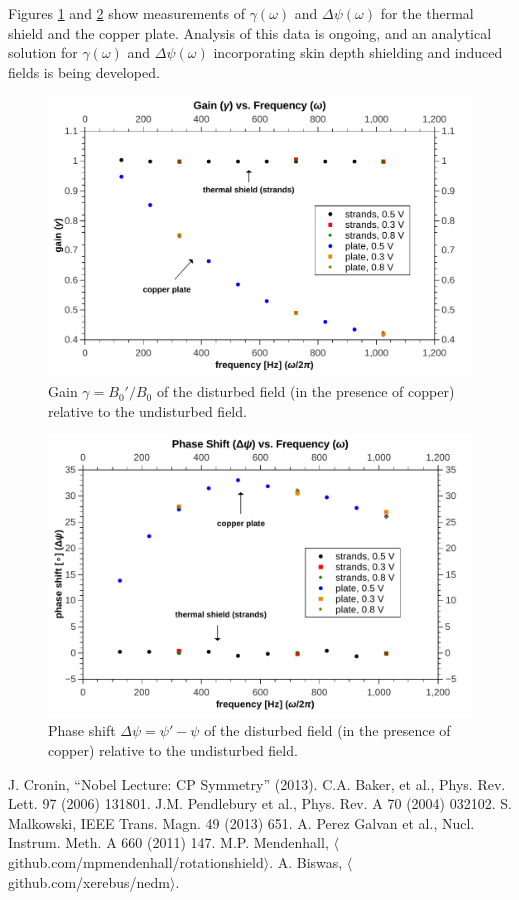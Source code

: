 \documentclass[twocolumn,aps,prb,citeautoscript]{revtex4-1}
\begin{document}
Figures \ref{gain} and \ref{phase} show measurements of
$\gamma(\omega)$ and $\Delta\psi(\omega)$ for the thermal shield and the copper plate. Analysis of this
data is ongoing, and an analytical solution for $\gamma(\omega)$ and $\Delta\psi(\omega)$ incorporating skin
depth shielding and induced fields is being developed.


\begin{figure}
\includegraphics[width=0.9\linewidth]{savedplots/Graph1.pdf}
\caption{\label{gain} Gain $\gamma = B_0' / B_0$ of the disturbed field (in the presence of copper) relative
to the undisturbed field.}
\end{figure}
\begin{figure}
\includegraphics[width=0.9\linewidth]{savedplots/Graph2.pdf}
\caption{\label{phase} Phase shift $\Delta\psi = \psi' - \psi$
of the disturbed field (in the presence of copper) relative to the undisturbed field.}
\end{figure}

\begin{thebibliography}{}
 J. Cronin, ``Nobel Lecture: CP Symmetry'' (2013).
 C.A. Baker, et al., Phys. Rev. Lett. 97 (2006) 131801.
 J.M. Pendlebury et al., Phys. Rev. A 70 (2004) 032102.
 S. Malkowski, IEEE Trans. Magn. 49 (2013) 651.
 A. Perez Galvan et al., Nucl. Instrum. Meth. A 660 (2011) 147.
 M.P. Mendenhall, $\langle$github.com/mpmendenhall/rotationshield$\rangle$.
 A. Biswas, $\langle$github.com/xerebus/nedm$\rangle$.
\end{thebibliography}
\end{document}
